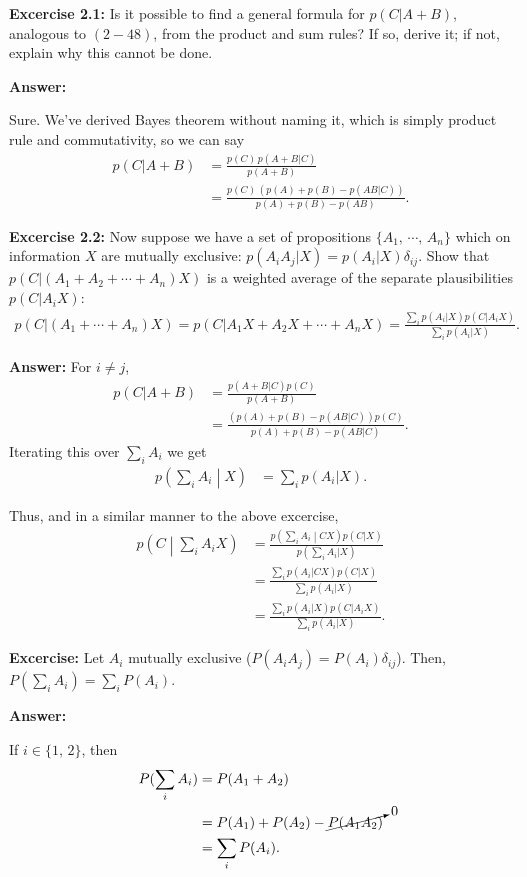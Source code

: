 \documentclass{article}
\begin{document}
\textbf{Excercise 2.1: }Is it possible to find a general formula for $p(C|A+B)$, analogous to $(2-48)$, from the product and sum rules? If so, derive it; if not, explain why this cannot be done.

\textbf{Answer:}

Sure. We've derived Bayes theorem without naming it, which is simply product rule and commutativity, so we can say
\begin{align*}
	p(C|A+B)&=\frac{p(C)\,p(A+B|C)}{p(A+B)}\\
	&=\frac{p(C)\,\left(p(A)+p(B)-p(AB|C)\right)}{p(A)+p(B)-p(AB)}.
\end{align*}

\textbf{Excercise 2.2: }Now suppose we have a set of propositions $\{A_1,\,\cdots,\,A_n\}$ which on information $X$ are mutually exclusive: $p(A_iA_j|X)=p(A_i|X)\delta_{ij}$. Show that $p(C|(A_1+A_2+\cdots+A_n)X)$ is a weighted average of the separate plausibilities $p(C|A_iX)$:
\begin{align*}
	p(C|(A_1+\cdots+A_n)X)=p(C|A_1X+A_2X+\cdots+A_nX)=\frac{\sum_ip(A_i|X)p(C|A_iX)}{\sum_ip(A_i|X)}.
\end{align*}

\textbf{Answer:}
For $i\neq j$,
\begin{align*}
	p(C|A+B)&=\frac{p(A+B|C)p(C)}{p(A+B)}\\
	&=\frac{(p(A)+p(B)-p(AB|C))p(C)}{p(A)+p(B)-p(AB|C)}.
\end{align*}
Iterating this over $\sum_iA_i$ we get
\begin{align*}
	p\left(\sum_iA_i\middle|X\right)&=\sum_ip(A_i|X).
\end{align*}

Thus, and in a similar manner to the above excercise,
\begin{align*}
	p\left(C\middle|\sum_iA_iX\right)&=\frac{p\left(\sum_iA_i\middle|CX\right)p(C|X)}{p(\sum_iA_i|X)}\\
	&=\frac{\sum_ip(A_i|CX)p(C|X)}{\sum_ip(A_i|X)}\\
	&=\frac{\sum_ip(A_i|X)p(C|A_iX)}{\sum_ip(A_i|X)}.
\end{align*}

\textbf{Excercise: }Let $A_i$ mutually exclusive ($P(A_iA_j)=P(A_i)\delta_{ij}$). Then, $P(\sum_iA_i)=\sum_iP(A_i)$.

\textbf{Answer: }

If $i\in\{1,\,2\}$, then
\begin{align}
	P(\sum_iA_i)&=P(A_1+A_2)\\
	&=P(A_1)+P(A_2)-\cancelto0{P(A_1A_2)}\\
	&=\sum_iP(A_i).
\end{align}
\end{document}
